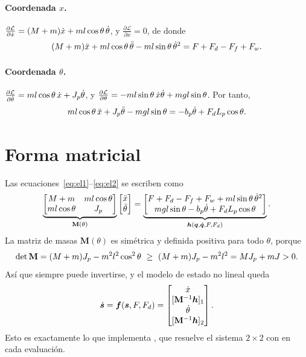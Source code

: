 \paragraph{Coordenada $x$.} $\frac{\partial\mathcal L}{\partial\dot{x}}=(M+m)\dot{x}+ml\cos\theta\,\dot{\theta}$, y $\frac{\partial\mathcal L}{\partial x}=0$, de donde
\begin{equation}
  (M+m)\ddot{x} + ml\cos\theta\,\ddot{\theta} - ml\sin\theta\,\dot{\theta}^2 = F + F_d - F_f + F_w .
  \label{eq:el1}
\end{equation}

\paragraph{Coordenada $\theta$.} $\frac{\partial\mathcal L}{\partial\dot{\theta}}=ml\cos\theta\,\dot{x}+J_p\dot{\theta}$, y $\frac{\partial\mathcal L}{\partial\theta}=-ml\sin\theta\,\dot{x}\dot{\theta}+mgl\sin\theta$. Por tanto,
\begin{equation}
  ml\cos\theta\,\ddot{x} + J_p\ddot{\theta} - mgl\sin\theta = -b_p\dot{\theta} + F_dL_p\cos\theta .
  \label{eq:el2}
\end{equation}

\section{Forma matricial}

Las ecuaciones~\eqref{eq:el1}--\eqref{eq:el2} se escriben como
\begin{equation}
\underbrace{\begin{bmatrix} M+m & ml\cos\theta\\ ml\cos\theta & J_p\end{bmatrix}}_{\mathbf{M}(\theta)}
\begin{bmatrix}\ddot{x}\\ \ddot{\theta}\end{bmatrix}
=
\underbrace{\begin{bmatrix} F + F_d - F_f + F_w + ml\sin\theta\,\dot{\theta}^2\\ mgl\sin\theta - b_p\dot{\theta} + F_dL_p\cos\theta\end{bmatrix}}_{\bm{h}(\bm{q},\dot{\bm{q}},F,F_d)} .
\label{eq:matricial}
\end{equation}
La matriz de masas $\mathbf{M}(\theta)$ es simétrica y definida positiva para todo $\theta$, porque
\begin{equation}
  \det\mathbf{M} = (M+m)J_p - m^2l^2\cos^2\theta \ \ge\ (M+m)J_p-m^2l^2 = MJ_p + mJ > 0 .
\end{equation}
Así que siempre puede invertirse, y el modelo de estado no lineal queda
\begin{equation}
  \dot{\vect{s}} = \vect{f}(\vect{s},F,F_d) =
  \begin{bmatrix}\xd\\ [\mathbf{M}^{-1}\vect{h}]_1\\ \thd\\ [\mathbf{M}^{-1}\vect{h}]_2\end{bmatrix}.
  \label{eq:nl}
\end{equation}
Esto es exactamente lo que implementa , que resuelve el sistema $2\times2$ con  en cada evaluación.

